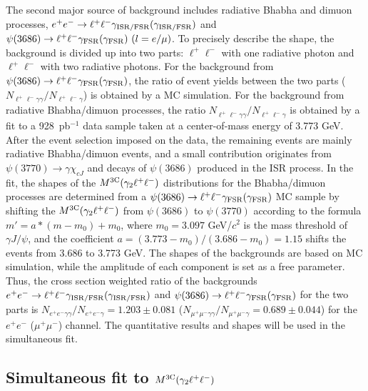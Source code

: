 \documentclass[prd,twocolumn,showpacs,amsmath,amssymb]{revtex4-1}
\begin{document}
The second major source of background includes radiative Bhabha and dimuon processes, $e^{+}e^{-}\rightarrow \ell^{+}\ell^{-}\gamma_{\rm ISR/FSR}(\gamma_{\rm ISR/FSR})$
and $\psi(3686)\rightarrow \ell^{+}\ell^{-}\gamma_{\rm FSR}(\gamma_{\rm FSR})~ (l=e/\mu)$. To precisely describe the shape, the background is divided up into
two parts: $\ell^{+}\ell^{-}$ with one radiative photon and $\ell^{+}\ell^{-}$ with two radiative photons. For the background from $\psi(3686)\to \ell^{+}\ell^{-}\gamma_{\rm FSR}(\gamma_{\rm FSR})$, the ratio of event yields between the two parts ($N_{\ell^+\ell^-\gamma\gamma}/N_{\ell^+\ell^-\gamma}$) is obtained by a MC simulation. For the background from radiative Bhabha/dimuon processes,
the ratio $N_{\ell^+\ell^-\gamma\gamma}/N_{\ell^+\ell^-\gamma}$ is obtained by a fit to a 928~pb$^{-1}$ data sample taken at a center-of-mass energy of 3.773 GeV.
After the event selection imposed on the data, the remaining events are mainly radiative Bhabha/dimuon events, and a small contribution originates
from $\psi(3770)\to\gamma\chi_{cJ}$ and decays of $\psi(3686)$ produced in the ISR process.
In the fit, the shapes of the $M^{3\rm C}(\gamma_{2}\ell^+\ell^-)$ distributions for the Bhabha/dimuon processes are determined
from a $\psi(3686)\rightarrow \ell^{+}\ell^{-}\gamma_{\rm FSR}(\gamma_{\rm FSR})$ MC sample by shifting the $M^{\rm 3C}(\gamma_2 \ell^{+}\ell^{-})$ from $\psi(3686)$ to $\psi(3770)$ according to the formula $m'=a*(m-m_{0})+m_{0}$,
where $m_{0} = 3.097$ GeV/$c^2$ is the mass threshold of $\gamma J/\psi$, and the coefficient $a = (3.773-m_{0})/(3.686-m_{0}) = 1.15$ shifts the events from 3.686 to 3.773 GeV.
 The shapes of the backgrounds are based on
MC simulation, while the amplitude of each component is set as a free parameter.
Thus, the cross section weighted ratio
of the backgrounds $e^+e^-\to \ell^+\ell^-\gamma_{\rm ISR/FSR}(\gamma_{\rm ISR/FSR})$ and $\psi(3686)\to \ell^+\ell^-\gamma_{\rm FSR}(\gamma_{\rm FSR})$ for the two parts is $N_{e^{+}e^{-}\gamma\gamma}/N_{e^{+}e^{-}\gamma} = 1.203\pm0.081$ ($N_{\mu^{+}\mu^{-}\gamma\gamma}/N_{\mu^{+}\mu^{-}\gamma} = 0.689\pm0.044$) for the $e^{+}e^{-}$ ($\mu^{+}\mu^{-}$) channel. The quantitative results and shapes will be used in the simultaneous fit.

\subsection{\boldmath Simultaneous fit to $M^{\rm 3C}(\gamma_{2}\ell^{+}\ell^{-})$}
\end{document}
